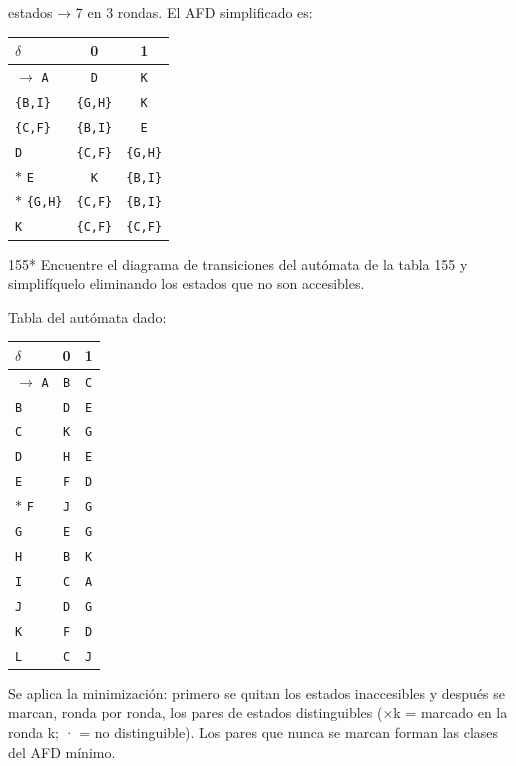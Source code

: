 \documentclass[11pt]{article}
\begin{document}
 estados → 7 en 3 rondas. El AFD simplificado es:
\begin{center}\small\begin{tabular}{lcc}\toprule
$\delta$ & 0 & 1 \\\midrule
$\to$ \texttt{A} & \texttt{D} & \texttt{K} \\
 \texttt{\{B,I\}} & \texttt{\{G,H\}} & \texttt{K} \\
 \texttt{\{C,F\}} & \texttt{\{B,I\}} & \texttt{E} \\
 \texttt{D} & \texttt{\{C,F\}} & \texttt{\{G,H\}} \\
$*$ \texttt{E} & \texttt{K} & \texttt{\{B,I\}} \\
$*$ \texttt{\{G,H\}} & \texttt{\{C,F\}} & \texttt{\{B,I\}} \\
 \texttt{K} & \texttt{\{C,F\}} & \texttt{\{C,F\}} \\
\bottomrule\end{tabular}\end{center}



\begin{ejercicio}{155}{*}
Encuentre el diagrama de transiciones del autómata de la tabla 155 y simplifíquelo eliminando los estados que no son accesibles.
\end{ejercicio}
\proc Tabla del autómata dado:
\begin{center}\small\begin{tabular}{lcc}\toprule
$\delta$ & 0 & 1 \\\midrule
$\to$ \texttt{A} & \texttt{B} & \texttt{C} \\
 \texttt{B} & \texttt{D} & \texttt{E} \\
 \texttt{C} & \texttt{K} & \texttt{G} \\
 \texttt{D} & \texttt{H} & \texttt{E} \\
 \texttt{E} & \texttt{F} & \texttt{D} \\
$*$ \texttt{F} & \texttt{J} & \texttt{G} \\
 \texttt{G} & \texttt{E} & \texttt{G} \\
 \texttt{H} & \texttt{B} & \texttt{K} \\
 \texttt{I} & \texttt{C} & \texttt{A} \\
 \texttt{J} & \texttt{D} & \texttt{G} \\
 \texttt{K} & \texttt{F} & \texttt{D} \\
 \texttt{L} & \texttt{C} & \texttt{J} \\
\bottomrule\end{tabular}\end{center}
Se aplica la minimización: primero se quitan los estados inaccesibles y después se marcan, ronda por ronda, los pares de estados distinguibles (×k = marcado en la ronda k; · = no distinguible). Los pares que nunca se marcan forman las clases del AFD mínimo.
\end{document}
